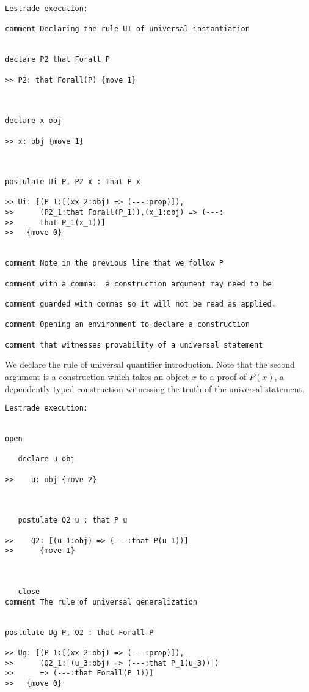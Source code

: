 \documentclass[12pt]{article}
\begin{document}
\begin{verbatim}Lestrade execution:

comment Declaring the rule UI of universal instantiation


declare P2 that Forall P

>> P2: that Forall(P) {move 1}



declare x obj

>> x: obj {move 1}



postulate Ui P, P2 x : that P x

>> Ui: [(P_1:[(xx_2:obj) => (---:prop)]),
>>      (P2_1:that Forall(P_1)),(x_1:obj) => (---:
>>      that P_1(x_1))]
>>   {move 0}


comment Note in the previous line that we follow P 

comment with a comma:  a construction argument may need to be 

comment guarded with commas so it will not be read as applied.

comment Opening an environment to declare a construction 

comment that witnesses provability of a universal statement

\end{verbatim}

We declare the rule of universal quantifier introduction.  Note that the second argument is a construction which takes an object $x$ to a proof of $P(x)$, a dependently typed construction witnessing the truth of the universal statement.

\begin{verbatim}Lestrade execution:


open

   declare u obj

>>    u: obj {move 2}



   postulate Q2 u : that P u

>>    Q2: [(u_1:obj) => (---:that P(u_1))]
>>      {move 1}



   close
comment The rule of universal generalization


postulate Ug P, Q2 : that Forall P

>> Ug: [(P_1:[(xx_2:obj) => (---:prop)]),
>>      (Q2_1:[(u_3:obj) => (---:that P_1(u_3))])
>>      => (---:that Forall(P_1))]
>>   {move 0}


\end{verbatim}
\end{document}
